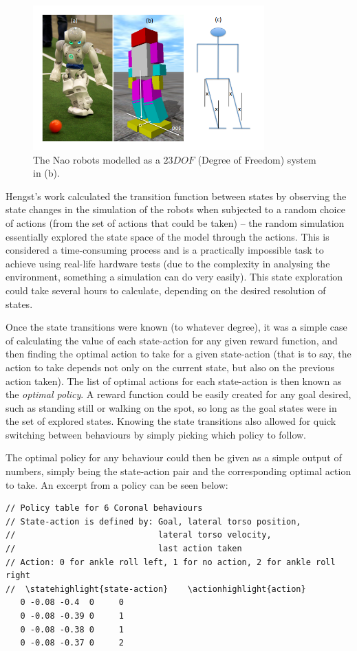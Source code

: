 \begin{figure}[h]
\centering
\includegraphics[width=3.5in]{img/RL_lean.png}
\caption{The Nao robots modelled as a $23 DOF$ (Degree of Freedom) system in (b). \cite{bernhard_rl}}
\label{fig:lean}
\end{figure}

Hengst's work calculated the transition function between states by observing the state changes in the simulation of the robots when subjected to a random choice of actions (from the set of actions that could be taken) -- the random simulation essentially explored the state space of the model through the actions. This is considered a time-consuming process and is a practically impossible task to achieve using real-life hardware tests (due to the complexity in analysing the environment, something a simulation can do very easily). This state exploration could take several hours to calculate, depending on the desired resolution of states.

Once the state transitions were known (to whatever degree), it was a simple case of calculating the value of each state-action for any given reward function, and then finding the optimal action to take for a given state-action (that is to say, the action to take depends not only on the current state, but also on the previous action taken). The list of optimal actions for each state-action is then known as the \textit{optimal policy}. A reward function could be easily created for any goal desired, such as standing still or walking on the spot, so long as the goal states were in the set of explored states. Knowing the state transitions also allowed for quick switching between behaviours by simply picking which policy to follow.

The optimal policy for any behaviour could then be given as a simple output of numbers, simply being the state-action pair and the corresponding optimal action to take. An excerpt from a policy can be seen below:


\newcommand\statehighlight[1]{\textcolor[rgb]{1,0,0}{#1}}
\newcommand\actionhighlight[1]{\textcolor[rgb]{0,0,1}{#1}}
\begin{Verbatim}[commandchars=\\\{\},frame=single]
// Policy table for 6 Coronal behaviours
// State-action is defined by: Goal, lateral torso position, 
//                             lateral torso velocity, 
//                             last action taken
// Action: 0 for ankle roll left, 1 for no action, 2 for ankle roll right
//  \statehighlight{state-action}    \actionhighlight{action}
   0 -0.08 -0.4  0     0
   0 -0.08 -0.39 0     1
   0 -0.08 -0.38 0     1
   0 -0.08 -0.37 0     2
\end{Verbatim}

